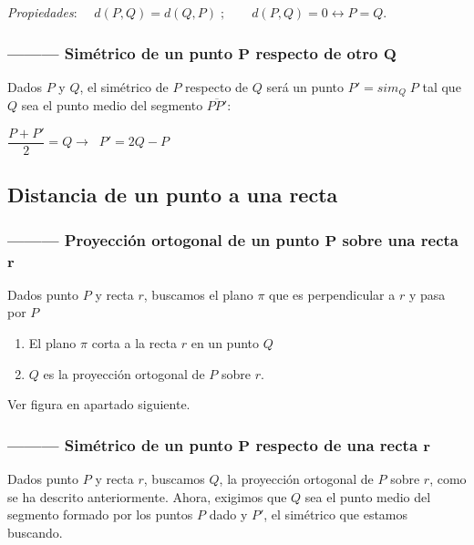\justify

\noindent \textit{Propiedades}:
$\quad d(P,Q)=d(Q,P)\; ;  \qquad  d(P,Q)=0 \leftrightarrow P=Q$.	


\subsubsection{--------- Simétrico de un punto $\boldsymbol{P}$ respecto de otro $\boldsymbol{Q}$}

Dados $P$ y $Q$, el simétrico de $P$ respecto de $Q$ será un punto $P'=sim_Q\;{P}$  tal que $Q$ sea el punto medio del segmento $\overline{PP'}$:

$\dfrac{P+P'}{2}=Q \to \;\; P'=2Q-P$



\subsection{Distancia de un punto a una recta}

\subsubsection{--------- Proyección ortogonal de un punto $\boldsymbol{P}$ sobre una recta $\boldsymbol{r}$}

Dados punto $P$ y recta $r$, buscamos el plano $\pi$ que es perpendicular a $r$ y pasa por $P$

\begin{enumerate}
\item El plano $\pi$ corta a la recta $r$ en un punto $Q$ 
\item $Q$ es la proyección ortogonal de $P$ sobre $r$.
\end{enumerate}
Ver figura en apartado siguiente.

\subsubsection{--------- Simétrico de un punto $\boldsymbol{P}$ respecto de una recta $\boldsymbol{r}$}
Dados punto $P$ y recta $r$, buscamos $Q$, la proyección ortogonal de $P$ sobre $r$, como se ha descrito anteriormente. Ahora, exigimos que $Q$ sea el punto medio del segmento formado por los puntos $P$ dado y $P'$, el simétrico que estamos buscando.

